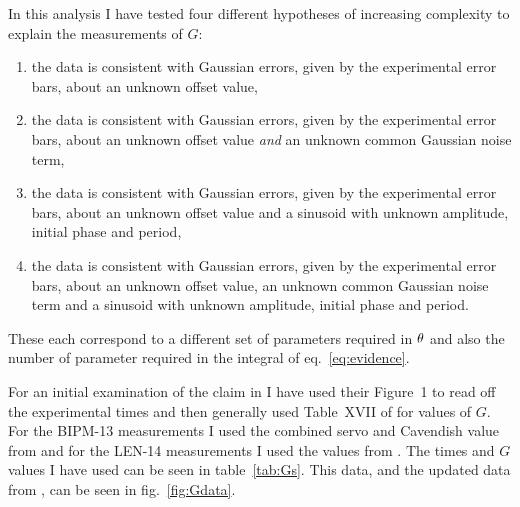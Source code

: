 \documentclass[page-classic]{epl2}
\begin{document}
In this analysis I have tested four different hypotheses of increasing complexity to explain the measurements of $G$:
\begin{enumerate}
 \item the data is consistent with Gaussian errors, given by the experimental error bars, about an unknown
 offset value,
 \item the data is consistent with Gaussian errors, given by the experimental error bars, about an unknown
 offset value {\it and} an unknown common Gaussian noise term,
 \item the data is consistent with Gaussian errors, given by the experimental error bars, about an unknown
 offset value and a sinusoid with unknown amplitude, initial phase and period,
 \item the data is consistent with Gaussian errors, given by the experimental error bars, about an unknown
 offset value, an unknown common Gaussian noise term and a sinusoid with unknown amplitude, initial phase and period.
\end{enumerate}
These each correspond to a different set of parameters required in $\mathbf{\theta}$ and also the number of
parameter required in the integral of eq.~\ref{eq:evidence}.

For an initial examination of the claim in \cite{2015EL....11010002A} I have used their Figure~1 to read off
the experimental times and then generally used Table~XVII of \cite{RevModPhys.84.1527} for values of $G$.
For the BIPM-13 measurements I used the combined servo and Cavendish value from \cite{PhysRevLett.113.039901}
and for the LEN-14 measurements I used the values from \cite{2014Natur.510..518R}. The times and $G$ values I
have used can be seen in table~\ref{tab:Gs}. This data, and the updated data from \cite{2015arXiv150501774S},
can be seen in fig.~\ref{fig:Gdata}.
\end{document}
